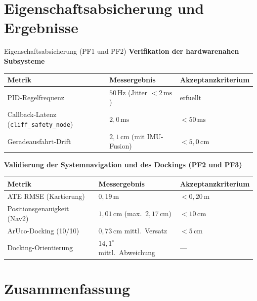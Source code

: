 \documentclass[aspectratio=169]{beamer}
\begin{document}
\section{Eigenschaftsabsicherung und Ergebnisse}

\begin{frame}{Eigenschaftsabsicherung (PF1 und PF2)}
  \textbf{Verifikation der hardwarenahen Subsysteme}

  \vspace{0.2em}
  {\small
  \begin{tabular}{@{}lll@{}}
    \toprule
    \textbf{Metrik} & \textbf{Messergebnis} & \textbf{Akzeptanzkriterium} \\
    \midrule
    PID-Regelfrequenz    & $50\,\mathrm{Hz}$ (Jitter $< 2\,\mathrm{ms}$) & erfuellt \\
    Callback-Latenz (\texttt{cliff\_safety\_node}) & $2{,}0\,\mathrm{ms}$ & $< 50\,\mathrm{ms}$ \\
    Geradeausfahrt-Drift & $2{,}1\,\mathrm{cm}$ (mit IMU-Fusion) & $< 5{,}0\,\mathrm{cm}$ \\
    \bottomrule
  \end{tabular}}

  \vspace{0.8em}
  \textbf{Validierung der Systemnavigation und des Dockings (PF2 und PF3)}

  \vspace{0.2em}
  {\small
  \begin{tabular}{@{}lll@{}}
    \toprule
    \textbf{Metrik} & \textbf{Messergebnis} & \textbf{Akzeptanzkriterium} \\
    \midrule
    ATE RMSE (Kartierung) & $0{,}19\,\mathrm{m}$ & $< 0{,}20\,\mathrm{m}$ \\
    Positionsgenauigkeit (Nav2) & $1{,}01\,\mathrm{cm}$ (max.\ $2{,}17\,\mathrm{cm}$) & $< 10\,\mathrm{cm}$ \\
    ArUco-Docking (10/10) & $0{,}73\,\mathrm{cm}$ mittl.\ Versatz & $< 5\,\mathrm{cm}$ \\
    Docking-Orientierung & $14{,}1^\circ$ mittl.\ Abweichung & --- \\
    \bottomrule
  \end{tabular}}
\end{frame}

\section{Zusammenfassung}
\end{document}
